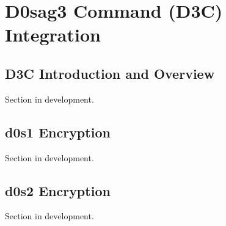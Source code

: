 \chapter{D0sag3 Command (D3C) Integration} \label{D3C}
\pagestyle{fancy}

\section{D3C Introduction and Overview}

Section in development.

\section{d0s1 Encryption}

Section in development.

\section{d0s2 Encryption}

Section in development.
